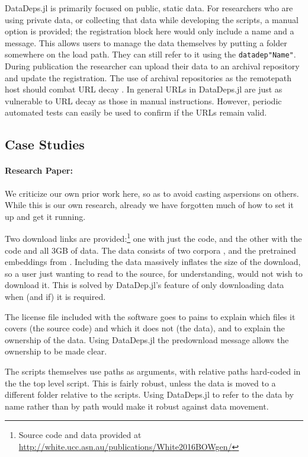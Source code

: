 \documentclass[twoside,11pt]{article}
\newcommand{\datadep}[1]{\texttt{datadep"{}#1"{}}}
\begin{document}
DataDeps.jl is primarily focused on public, static data.
For researchers who are using private data, or collecting that data while developing the scripts, a manual option is provided; the registration block here would only include a name and a message. This allows users to manage the data themselves by putting a folder somewhere on the load path. They can still refer to it using the \datadep{Name}.
During publication the researcher can upload their data to an archival repository and update the registration.
The use of archival repositories as the remotepath host should combat URL decay \citep{wren2008url}. In general URLs in DataDeps.jl are just as vulnerable to URL decay as those in manual instructions.
However, periodic automated tests can easily be used to confirm if the URLs remain valid.




\subsection{Case Studies}\label{sec:case-studies}
\paragraph{Research Paper: \citet{White2015BOWgen}}
We criticize our own prior work here, so as to avoid casting aspersions on others. 
While this is our own research, already we have forgotten much of how to set it up and get it running.

Two download links are provided:\footnote{Source code and data provided at \url{http://white.ucc.asn.au/publications/White2016BOWgen/}}
one with just the code, and the other with the code and all 3GB of data.
The data consists of two corpora \citep{francis1979brown,moviebook}, and the pretrained embeddings from \citet{pennington2014glove}.
Including the data massively inflates the size of the download, so a user just wanting to read to the source, for understanding, would not wish to download it.
This is solved by DataDep.jl's feature of only downloading data when (and if) it is required.

The license file included with the software goes to pains to explain which files it covers (the source code) and which it does not (the data), and to explain the ownership of the data.
Using DataDeps.jl the predownload message allows the ownership to be made clear.

The scripts themselves use paths as arguments, with relative paths hard-coded in the the top level script.
This is fairly robust, unless the data is moved to a different folder relative to the scripts.
Using DataDeps.jl to refer to the data by name rather than by path would make it robust against data movement.
\end{document}
